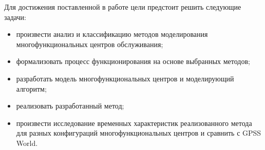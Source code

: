 Для достижения поставленной в работе цели предстоит решить следующие задачи:
\begin{itemize}[label=---]
	\item произвести анализ и классификацию методов моделирования многофункциональных центров обслуживания;
	\item формализовать процесс функционирования на основе выбранных методов;
	\item разработать модель многофункциональных центров и моделирующий алгоритм;
	\item реализовать разработанный метод; 
	\item произвести исследование временных характеристик реализованного метода для разных конфигураций многофункциональных центров и сравнить с GPSS World.
\end{itemize}
